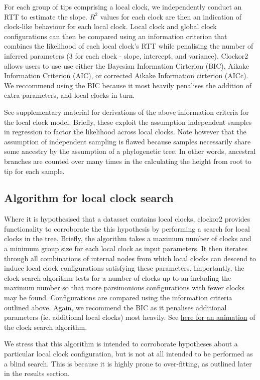 \documentclass{article}
\begin{document}
For each group of tips comprising a local clock, we independently conduct an RTT to estimate the slope. $R^2$ values for each clock are then an indication of clock-like behaviour for each local clock. Local clock and global clock configurations can then be compared using an information criterion that combines the likelihood of each local clock's RTT while penalising the number of inferred parameters (3 for each clock - slope, intercept, and variance). Clockor2 allows users to use use either the Bayesian Information Cirterion (BIC), Aikake Information Criterion (AIC), or corrected Aikake Information cirterion (AICc). We reccommend using the BIC because it most heavily penalises the addition of extra parameters, and local clocks in turn.

See supplementary material for derivations of the above information criteria for the local clock model. Briefly, these exploit the assumption independent samples in regression to factor the likelihood across local clocks. Note however that the assumption of independent sampling is flawed because samples necessarily share some ancestry by the assumption of a phylogenetic tree. In other words, ancestral branches are counted over many times in the calculating the height from root to tip for each sample. 


\subsection*{Algorithm for local clock search}
Where it is hypothesised that a datasset contains local clocks, clockor2 provides functionality to corroborate the this hypothesis by performing a search for local clocks in the tree. Briefly, the algorithm takes a maximum number of clocks and a minimum group size for each local clock as input parameters. It then iterates through all combinations of internal nodes from which local clocks can descend to induce local clock configurations satisfying these parameters. Importantly, the clock search algorithm tests for a number of clocks up to an including the maximum number so that more parsimonious configurations with fewer clocks may be found. Configurations are compared using the information criteria outlined above. Again, we recommend the BIC as it penalises additional parameters (ie. additional local clocks) most heavily. See \href{https://github.com/LeoFeatherstone/clockor2Paper/blob/main/figures/clockSearchEg2Clocks.gif}{here for an animation} of the clock search algorithm. 

We stress that this algorithm is intended to corroborate hypotheses about a particular local clock configuration, but is not at all intended to be performed as a blind search. This is because it is highly prone to over-fitting, as outlined later in the results section.
\end{document}

